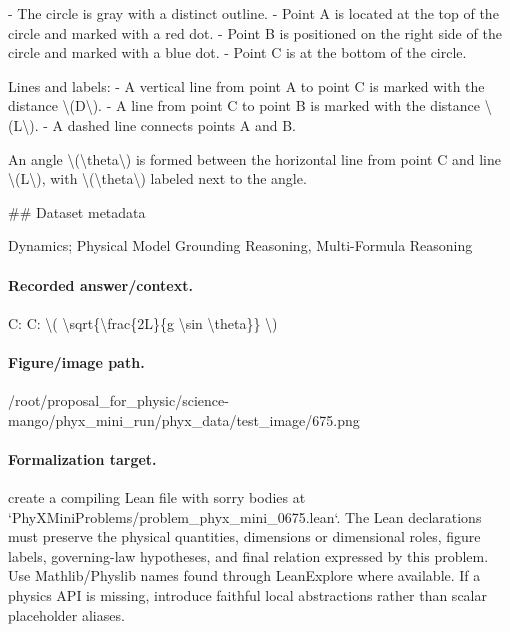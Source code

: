 - The circle is gray with a distinct outline.
- Point A is located at the top of the circle and marked with a red dot. 
- Point B is positioned on the right side of the circle and marked with a blue dot.
- Point C is at the bottom of the circle.
  
Lines and labels:
- A vertical line from point A to point C is marked with the distance \textbackslash{}(D\textbackslash{}).
- A line from point C to point B is marked with the distance \textbackslash{}(L\textbackslash{}).
- A dashed line connects points A and B.
  
An angle \textbackslash{}(\textbackslash{}theta\textbackslash{}) is formed between the horizontal line from point C and line \textbackslash{}(L\textbackslash{}), with \textbackslash{}(\textbackslash{}theta\textbackslash{}) labeled next to the angle.

\#\# Dataset metadata

Dynamics; Physical Model Grounding Reasoning, Multi-Formula Reasoning

\paragraph{Recorded answer/context.}
C: C: \textbackslash{}( \textbackslash{}sqrt\{\textbackslash{}frac\{2L\}\{g \textbackslash{}sin \textbackslash{}theta\}\} \textbackslash{})

\paragraph{Figure/image path.}
/root/proposal\_for\_physic/science-mango/phyx\_mini\_run/phyx\_data/test\_image/675.png

\paragraph{Formalization target.}
create a compiling Lean file with sorry bodies at `PhyXMiniProblems/problem\_phyx\_mini\_0675.lean`. The Lean declarations must preserve the physical quantities, dimensions or dimensional roles, figure labels, governing-law hypotheses, and final relation expressed by this problem.
Use Mathlib/Physlib names found through LeanExplore where available. If a physics API is missing, introduce faithful local abstractions rather than scalar placeholder aliases.

